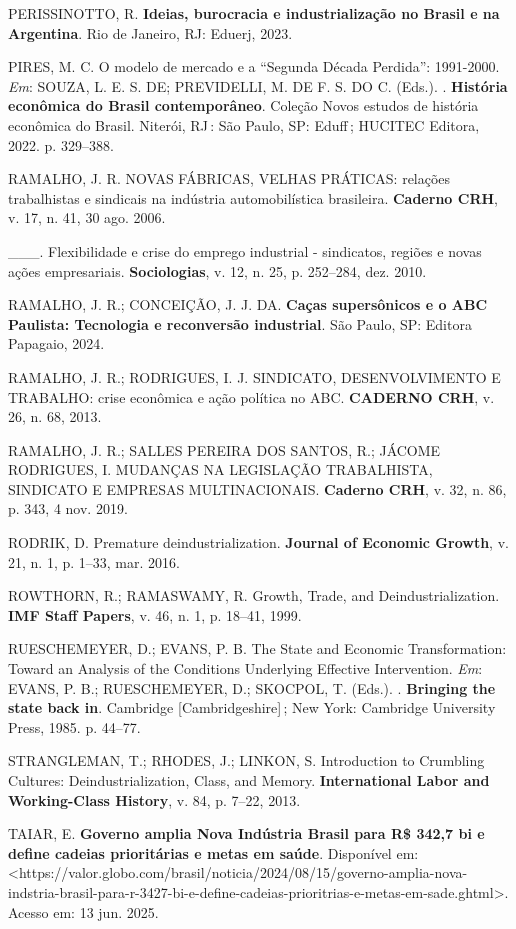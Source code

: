 PERISSINOTTO, R. \textbf{Ideias, burocracia e industrialização no Brasil
e na Argentina}. Rio de Janeiro, RJ: Eduerj, 2023.

PIRES, M. C. O modelo de mercado e a ``Segunda Década Perdida'':
1991-2000. \emph{Em}: SOUZA, L. E. S. DE; PREVIDELLI, M. DE F. S. DO C.
(Eds.). . \textbf{História econômica do Brasil contemporâneo}. Coleção
Novos estudos de história econômica do Brasil. Niterói, RJ\,: São Paulo,
SP: Eduff\,; HUCITEC Editora, 2022. p. 329--388.

RAMALHO, J. R. NOVAS FÁBRICAS, VELHAS PRÁTICAS: relações trabalhistas e
sindicais na indústria automobilística brasileira. \textbf{Caderno CRH},
v. 17, n. 41, 30 ago. 2006.

\_\_\_. Flexibilidade e crise do emprego industrial - sindicatos,
regiões e novas ações empresariais. \textbf{Sociologias}, v. 12, n. 25,
p. 252--284, dez. 2010.

RAMALHO, J. R.; CONCEIÇÃO, J. J. DA. \textbf{Caças supersônicos e o ABC
Paulista: Tecnologia e reconversão industrial}. São Paulo, SP: Editora
Papagaio, 2024.

RAMALHO, J. R.; RODRIGUES, I. J. SINDICATO, DESENVOLVIMENTO E TRABALHO:
crise econômica e ação política no ABC. \textbf{CADERNO CRH}, v. 26, n.
68, 2013.

RAMALHO, J. R.; SALLES PEREIRA DOS SANTOS, R.; JÁCOME RODRIGUES, I.
MUDANÇAS NA LEGISLAÇÃO TRABALHISTA, SINDICATO E EMPRESAS MULTINACIONAIS.
\textbf{Caderno CRH}, v. 32, n. 86, p. 343, 4 nov. 2019.

RODRIK, D. Premature deindustrialization. \textbf{Journal of Economic
Growth}, v. 21, n. 1, p. 1--33, mar. 2016.

ROWTHORN, R.; RAMASWAMY, R. Growth, Trade, and Deindustrialization.
\textbf{IMF Staff Papers}, v. 46, n. 1, p. 18--41, 1999.

RUESCHEMEYER, D.; EVANS, P. B. The State and Economic Transformation:
Toward an Analysis of the Conditions Underlying Effective Intervention.
\emph{Em}: EVANS, P. B.; RUESCHEMEYER, D.; SKOCPOL, T. (Eds.). .
\textbf{Bringing the state back in}. Cambridge {[}Cambridgeshire{]}\,;
New York: Cambridge University Press, 1985. p. 44--77.

STRANGLEMAN, T.; RHODES, J.; LINKON, S. Introduction to Crumbling
Cultures: Deindustrialization, Class, and Memory. \textbf{International
Labor and Working-Class History}, v. 84, p. 7--22, 2013.

TAIAR, E. \textbf{Governo amplia Nova Indústria Brasil para R\$ 342,7 bi
e define cadeias prioritárias e metas em saúde}. Disponível em:
\textless https://valor.globo.com/brasil/noticia/2024/08/15/governo-amplia-nova-indstria-brasil-para-r-3427-bi-e-define-cadeias-prioritrias-e-metas-em-sade.ghtml\textgreater.
Acesso em: 13 jun. 2025.

